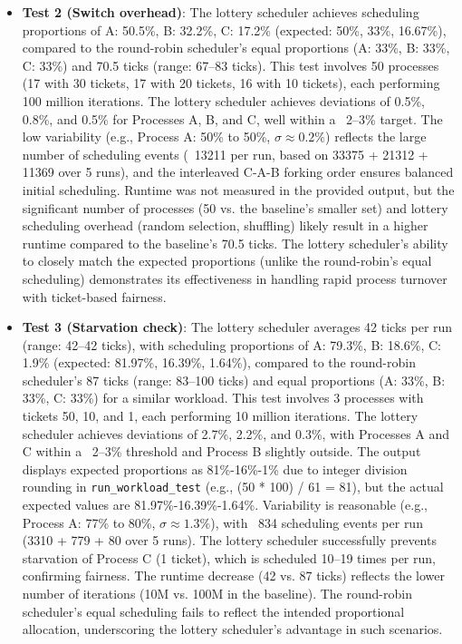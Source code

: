 \documentclass{article}
\begin{document}
\begin{itemize}
    \item \textbf{Test 2 (Switch overhead)}: The lottery scheduler achieves scheduling proportions of A: 50.5\%, B: 32.2\%, C: 17.2\% (expected: 50\%, 33\%, 16.67\%), compared to the round-robin scheduler’s equal proportions (A: 33\%, B: 33\%, C: 33\%) and 70.5 ticks (range: 67–83 ticks). This test involves 50 processes (17 with 30 tickets, 17 with 20 tickets, 16 with 10 tickets), each performing 100 million iterations. The lottery scheduler achieves deviations of 0.5\%, 0.8\%, and 0.5\% for Processes A, B, and C, well within a ~2–3\% target. The low variability (e.g., Process A: 50\% to 50\%, $\sigma \approx 0.2\%$) reflects the large number of scheduling events (~13211 per run, based on 33375 + 21312 + 11369 over 5 runs), and the interleaved C-A-B forking order ensures balanced initial scheduling. Runtime was not measured in the provided output, but the significant number of processes (50 vs. the baseline’s smaller set) and lottery scheduling overhead (random selection, shuffling) likely result in a higher runtime compared to the baseline’s 70.5 ticks. The lottery scheduler’s ability to closely match the expected proportions (unlike the round-robin’s equal scheduling) demonstrates its effectiveness in handling rapid process turnover with ticket-based fairness.
    
    \item \textbf{Test 3 (Starvation check)}: The lottery scheduler averages 42 ticks per run (range: 42–42 ticks), with scheduling proportions of A: 79.3\%, B: 18.6\%, C: 1.9\% (expected: 81.97\%, 16.39\%, 1.64\%), compared to the round-robin scheduler’s 87 ticks (range: 83–100 ticks) and equal proportions (A: 33\%, B: 33\%, C: 33\%) for a similar workload. This test involves 3 processes with tickets 50, 10, and 1, each performing 10 million iterations. The lottery scheduler achieves deviations of 2.7\%, 2.2\%, and 0.3\%, with Processes A and C within a ~2–3\% threshold and Process B slightly outside. The output displays expected proportions as 81\%-16\%-1\% due to integer division rounding in \texttt{run\_workload\_test} (e.g., (50 * 100) / 61 = 81), but the actual expected values are 81.97\%-16.39\%-1.64\%. Variability is reasonable (e.g., Process A: 77\% to 80\%, $\sigma \approx 1.3\%$), with ~834 scheduling events per run (3310 + 779 + 80 over 5 runs). The lottery scheduler successfully prevents starvation of Process C (1 ticket), which is scheduled 10–19 times per run, confirming fairness. The runtime decrease (42 vs. 87 ticks) reflects the lower number of iterations (10M vs. 100M in the baseline). The round-robin scheduler’s equal scheduling fails to reflect the intended proportional allocation, underscoring the lottery scheduler’s advantage in such scenarios.
\end{itemize}
\end{document}
